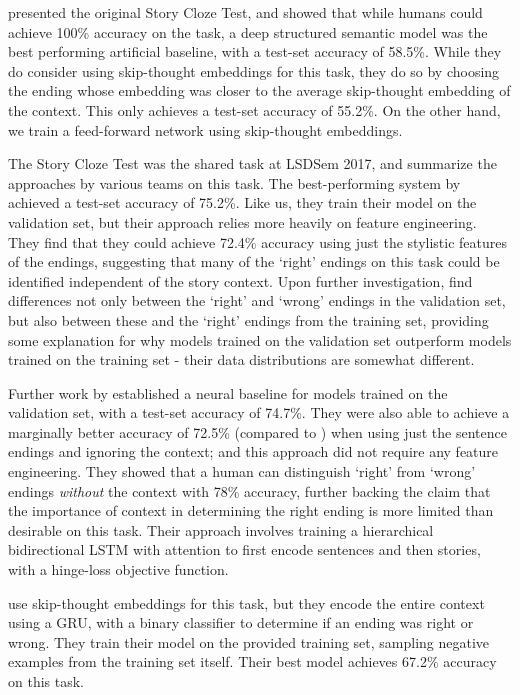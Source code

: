 \documentclass[11pt,a4paper]{article}
\begin{document}
\citet{mostafazadeh2016corpus} presented the original Story Cloze Test, and showed that while humans could achieve 100\% accuracy on the task, a deep structured semantic model \citep{huang2013learning} was the best performing artificial baseline, with a test-set accuracy of 58.5\%. While they do consider using skip-thought embeddings for this task, they do so by choosing the ending whose embedding was closer to the average skip-thought embedding of the context. This only achieves a test-set accuracy of 55.2\%. On the other hand, we train a feed-forward network using skip-thought embeddings.

The Story Cloze Test was the shared task at LSDSem 2017, and \citet{mostafazadeh2017lsdsem} summarize the approaches by various teams on this task. The best-performing system by \citet{schwartz2017story} achieved a test-set accuracy of 75.2\%. Like us, they train their model on the validation set, but their approach relies more heavily on feature engineering. They find that they could achieve 72.4\% accuracy using just the stylistic features of the endings, suggesting that many of the `right' endings on this task could be identified independent of the story context. Upon further investigation, \citet{Schwartz2017TheEO} find differences not only between the `right' and `wrong' endings in the validation set, but also between these and the `right' endings from the training set, providing some explanation for why models trained on the validation set outperform models trained on the training set - their data distributions are somewhat different.

Further work by \citet{Cai2017PayAT} established a neural baseline for models trained on the validation set, with a test-set accuracy of 74.7\%. They were also able to achieve a marginally better accuracy of 72.5\% (compared to \citet{schwartz2017story}) when using just the sentence endings and ignoring the context; and this approach did not require any feature engineering. They showed that a human can distinguish `right' from `wrong' endings \emph{without} the context with 78\% accuracy, further backing the claim that the importance of context in determining the right ending is more limited than desirable on this task. Their approach involves training a hierarchical bidirectional LSTM with attention to first encode sentences and then stories, with a hinge-loss objective function. 

\citet{roemmele2017rnn} use skip-thought embeddings for this task, but they encode the entire context using a GRU, with a binary classifier to determine if an ending was right or wrong. They train their model on the provided training set, sampling negative examples from the training set itself. Their best model achieves 67.2\% accuracy on this task.
\end{document}
